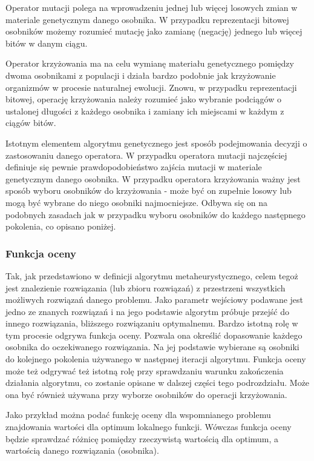 Operator mutacji polega na wprowadzeniu jednej lub więcej losowych zmian w materiale genetycznym danego osobnika. W przypadku reprezentacji bitowej osobników możemy rozumieć mutację jako zamianę (negację) jednego lub więcej bitów w danym ciągu.

Operator krzyżowania ma na celu wymianę materiału genetycznego pomiędzy dwoma osobnikami z populacji i działa bardzo podobnie jak krzyżowanie organizmów w procesie naturalnej ewolucji. Znowu, w przypadku reprezentacji bitowej, operację krzyżowania należy rozumieć jako wybranie podciągów o ustalonej długości z każdego osobnika i zamiany ich miejscami w każdym z ciągów bitów.

Istotnym elementem algorytmu genetycznego jest sposób podejmowania decyzji o zastosowaniu danego operatora. W przypadku operatora mutacji najczęściej definiuje się pewnie prawdopodobieństwo zajścia mutacji w materiale genetycznym danego osobnika. W przypadku operatora krzyżowania ważny jest sposób wyboru osobników do krzyżowania - może być on zupełnie losowy lub mogą być wybrane do niego osobniki najmocniejsze. Odbywa się on na podobnych zasadach jak w przypadku wyboru osobników do każdego następnego pokolenia, co opisano poniżej.

\subsubsection{Funkcja oceny}
Tak, jak przedstawiono w definicji algorytmu metaheurystycznego, celem tegoż jest znalezienie rozwiązania (lub zbioru rozwiązań) z przestrzeni wszystkich możliwych rozwiązań danego problemu. Jako parametr wejściowy podawane jest jedno ze znanych rozwiązań i na jego podstawie algorytm próbuje przejść do innego rozwiązania, bliższego rozwiązaniu optymalnemu. Bardzo istotną rolę w tym procesie odgrywa funkcja oceny. Pozwala ona określić dopasowanie każdego osobnika do oczekiwanego rozwiązania. Na jej podstawie wybierane są osobniki do kolejnego pokolenia używanego w następnej iteracji algorytmu. Funkcja oceny może też odgrywać też istotną rolę przy sprawdzaniu warunku zakończenia działania algorytmu, co zostanie opisane w dalszej części tego podrozdziału. Może ona być również używana przy wyborze osobników do operacji krzyżowania.

Jako przykład można podać funkcję oceny dla wspomnianego problemu znajdowania wartości dla optimum lokalnego funkcji. Wówczas funkcja oceny będzie sprawdzać różnicę pomiędzy rzeczywistą wartością dla optimum, a wartością danego rozwiązania (osobnika).

